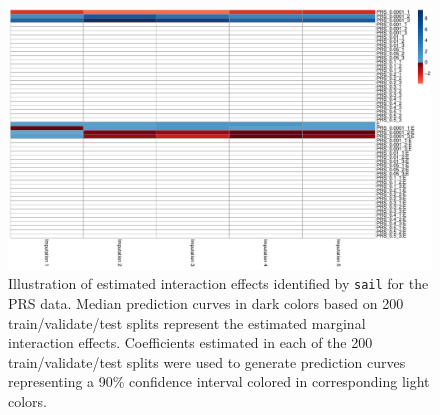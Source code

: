 \documentclass[12pt,letter]{article}\usepackage[]{graphicx}\usepackage[]{color}
\newenvironment{knitrout}{}{} %
\begin{document}
\begin{knitrout}\scriptsize
{}\color{fgcolor}\begin{figure}[H]

{\centering \includegraphics[width=1\linewidth]{figure/PRS-model-selection-1} 

}

\caption[Illustration of estimated interaction effects identified by \texttt{sail} for the PRS data]{Illustration of estimated interaction effects identified by \texttt{sail} for the PRS data. Median prediction curves in dark colors based on 200 train/validate/test splits represent the estimated marginal interaction effects. Coefficients estimated in each of the 200 train/validate/test splits were used to generate prediction curves representing a 90\% confidence interval colored in corresponding light colors.}\label{fig:PRS-model-selection}
\end{figure}


\end{knitrout}
\end{document}
